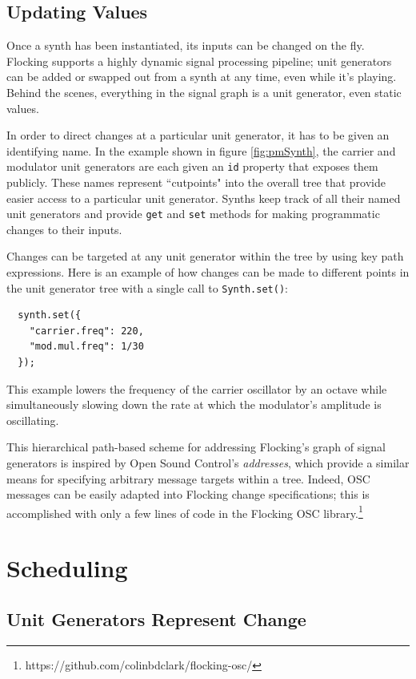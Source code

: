 \documentclass{article}
\begin{document}
\subsection{Updating Values}

Once a synth has been instantiated, its inputs can be changed on the fly. Flocking supports a highly dynamic signal processing pipeline; unit generators can be added or swapped out from a synth at any time, even while it's playing. Behind the scenes, everything in the signal graph is a unit generator, even static values.

In order to direct changes at a particular unit generator, it has to be given an identifying name. In the example shown in figure \ref{fig:pmSynth}, the carrier and modulator unit generators are each given an \verb|id| property that exposes them publicly. These names represent ``cutpoints" into the overall tree that provide easier access to a particular unit generator. Synths keep track of all their named unit generators and provide \verb|get| and \verb|set| methods for making programmatic changes to their inputs.

Changes can be targeted at any unit generator within the tree by using key path expressions. Here is an example of how changes can be made to different points in the unit generator tree with a single call to \verb|Synth.set()|:

\begin{verbatim}
  synth.set({
    "carrier.freq": 220,
    "mod.mul.freq": 1/30
  });
\end{verbatim}

This example lowers the frequency of the carrier oscillator by an octave while simultaneously slowing down the rate at which the modulator's amplitude is oscillating.

This hierarchical path-based scheme for addressing Flocking's graph of signal generators is inspired by Open Sound Control's {\it addresses}, which provide a similar means for specifying arbitrary message targets within a tree. Indeed, OSC messages can be easily adapted into Flocking change specifications; this is accomplished with only a few lines of code in the Flocking OSC library.\footnote{https://github.com/colinbdclark/flocking-osc/}

\section{Scheduling} \label{sec:Scheduling}

\subsection{Unit Generators Represent Change}
\end{document}
